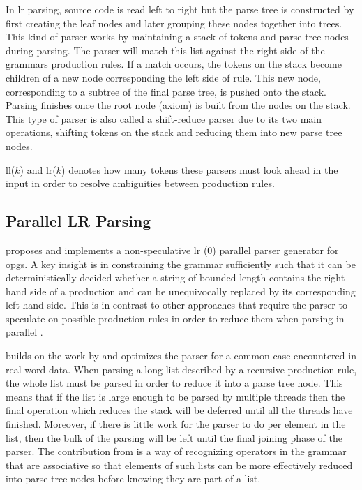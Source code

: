In \gls{lr} parsing, source code is read left to right but the parse tree is
constructed by first creating the leaf nodes and later grouping these nodes
together into trees. This kind of parser works by maintaining a stack of tokens
and parse tree nodes during parsing. The parser will match this list against
the right side of the grammars production rules. If a match occurs, the tokens
on the stack become children of a new node corresponding the left side of rule.
This new node, corresponding to a subtree of the final parse tree, is pushed
onto the stack. Parsing finishes once the root node (axiom) is built from the
nodes on the stack. This type of parser is also called a shift-reduce parser due
to its two main operations, shifting tokens on the stack and reducing them into
new parse tree nodes.

\gls{ll}($k$) and \gls{lr}($k$) denotes how many tokens these parsers must look
ahead in the input in order to resolve ambiguities between production rules.

\subsection{Parallel LR Parsing} \label{parallel_lr_parsing}

\cite{barenghi_parallel_2015} proposes and implements a non-speculative \gls{lr}
(0) parallel parser generator for \gls{opg}s. A key insight is in constraining
the grammar sufficiently such that it can be deterministically decided whether
a string of bounded length contains the right-hand side of a production
and can be unequivocally replaced by its corresponding left-hand side. This
is in contrast to other approaches that require the parser to speculate on
possible production rules in order to reduce them when parsing in parallel
\citep{mickunas_parallel_1978}.

\cite{li_associative_2023} builds on the work by \cite{barenghi_parallel_2015}
and optimizes the parser for a common case encountered in real word data. When
parsing a long list described by a recursive production rule, the whole list
must be parsed in order to reduce it into a parse tree node. This means that
if the list is large enough to be parsed by multiple threads then the final
operation which reduces the stack will be deferred until all the threads have
finished. Moreover, if there is little work for the parser to do per element
in the list, then the bulk of the parsing will be left until the final joining
phase of the parser. The contribution from \cite{li_associative_2023} is a way
of recognizing operators in the grammar that are associative so that elements of
such lists can be more effectively reduced into parse tree nodes before knowing
they are part of a list.

